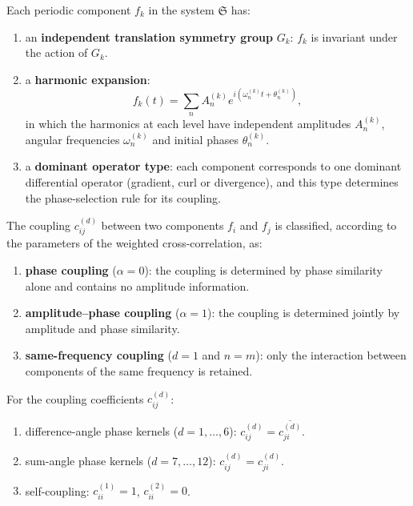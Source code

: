 \begin{definition}\label{def:sub-periodic-structure}
Each periodic component $f_k$ in the system $\mathfrak{S}$ has:
\begin{enumerate}[label=(\roman*)]
    \item an \textbf{independent translation symmetry group} $G_k$: $f_k$ is invariant under the action of $G_k$.
    \item a \textbf{harmonic expansion}:
    \[
    f_k(t)=\sum_n A_n^{(k)}e^{i(\omega_n^{(k)}t+\theta_n^{(k)})},
    \]
    in which the harmonics at each level have independent amplitudes $A_n^{(k)}$, angular frequencies $\omega_n^{(k)}$ and initial phases $\theta_n^{(k)}$.
    \item a \textbf{dominant operator type}: each component corresponds to one dominant differential operator (gradient, curl or divergence), and this type determines the phase-selection rule for its coupling.
\end{enumerate}
\end{definition}

\begin{definition}\label{def:coupling-types}
The coupling $c_{ij}^{(d)}$ between two components $f_i$ and $f_j$ is classified, according to the parameters of the weighted cross-correlation, as:
\begin{enumerate}[label=(\roman*)]
    \item \textbf{phase coupling} ($\alpha=0$): the coupling is determined by phase similarity alone and contains no amplitude information.
    \item \textbf{amplitude--phase coupling} ($\alpha=1$): the coupling is determined jointly by amplitude and phase similarity.
    \item \textbf{same-frequency coupling} ($d=1$ and $n=m$): only the interaction between components of the same frequency is retained.
\end{enumerate}
\end{definition}

\begin{proposition}\label{prop:coupling-symmetry}
For the coupling coefficients $c_{ij}^{(d)}$:
\begin{enumerate}[label=(\roman*)]
    \item difference-angle phase kernels ($d=1,\dots,6$): $c_{ij}^{(d)}=\overline{c_{ji}^{(d)}}$.
    \item sum-angle phase kernels ($d=7,\dots,12$): $c_{ij}^{(d)}=c_{ji}^{(d)}$.
    \item self-coupling: $c_{ii}^{(1)}=1$, $c_{ii}^{(2)}=0$.
\end{enumerate}
\end{proposition}

